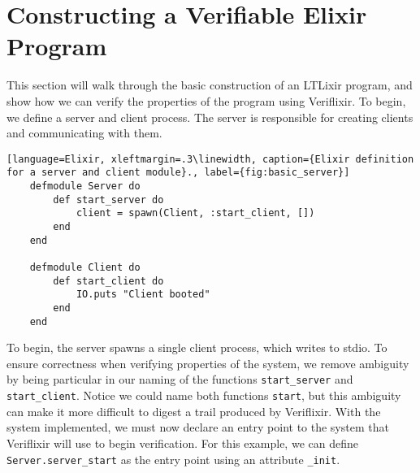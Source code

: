 \section{Constructing a Verifiable Elixir Program} \label{sec:verifiable}
This section will walk through the basic construction of an LTLixir program, and show how we can verify the properties of the program using Veriflixir. To begin, we define a server and client process. The server is responsible for creating clients and communicating with them. 
\begin{lstlisting}[language=Elixir, xleftmargin=.3\linewidth, caption={Elixir definition for a server and client module}., label={fig:basic_server}]
    defmodule Server do
        def start_server do
            client = spawn(Client, :start_client, [])
        end
    end

    defmodule Client do
        def start_client do
            IO.puts "Client booted"
        end
    end
\end{lstlisting}
To begin, the server spawns a single client process, which writes to stdio. To ensure correctness when verifying properties of the system, we remove ambiguity by being particular in our naming of the functions \texttt{start\_server} and \texttt{start\_client}. Notice we could name both functions \texttt{start}, but this ambiguity can make it more difficult to digest a trail produced by Veriflixir. With the system implemented, we must now declare an entry point to the system that Veriflixir will use to begin verification. For this example, we can define \texttt{Server.server\_start} as the entry point using an attribute \texttt{\@vae\_init}.

